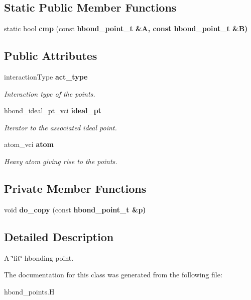 \subsection*{Static Public Member Functions}
\begin{CompactItemize}
\item 
static bool \textbf{cmp} (const \bf{hbond\_\-point\_\-t} \&A, const \bf{hbond\_\-point\_\-t} \&B)\label{classASCbase_1_1hbond__point__t_86692805c3b0ded25d5e64a74fb8089f}

\end{CompactItemize}
\subsection*{Public Attributes}
\begin{CompactItemize}
\item 
interaction\-Type \bf{act\_\-type}\label{classASCbase_1_1hbond__point__t_64018d64558cbf939525efb893679809}

\begin{CompactList}\small\item\em Interaction type of the points. \item\end{CompactList}\item 
hbond\_\-ideal\_\-pt\_\-vci \bf{ideal\_\-pt}\label{classASCbase_1_1hbond__point__t_9ba48d24b24579d4e3a810af1fc57453}

\begin{CompactList}\small\item\em Iterator to the associated ideal point. \item\end{CompactList}\item 
atom\_\-vci \bf{atom}\label{classASCbase_1_1hbond__point__t_efd938fefea14539848e466c7f08d325}

\begin{CompactList}\small\item\em Heavy atom giving rise to the points. \item\end{CompactList}\end{CompactItemize}
\subsection*{Private Member Functions}
\begin{CompactItemize}
\item 
void \textbf{do\_\-copy} (const \bf{hbond\_\-point\_\-t} \&p)\label{classASCbase_1_1hbond__point__t_ac9aceb4f7f609deebb437ec14b8b15a}

\end{CompactItemize}


\subsection{Detailed Description}
A \char`\"{}fit\char`\"{} hbonding point. 



The documentation for this class was generated from the following file:\begin{CompactItemize}
\item 
hbond\_\-points.H\end{CompactItemize}
